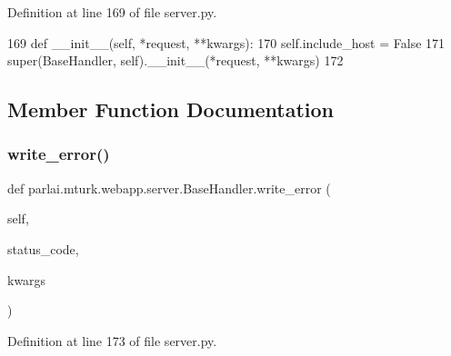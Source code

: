 Definition at line 169 of file server.\+py.


\begin{DoxyCode}
169     \textcolor{keyword}{def }\_\_init\_\_(self, *request, **kwargs):
170         self.include\_host = \textcolor{keyword}{False}
171         super(BaseHandler, self).\_\_init\_\_(*request, **kwargs)
172 
\end{DoxyCode}


\subsection{Member Function Documentation}
\mbox{\label{classparlai_1_1mturk_1_1webapp_1_1server_1_1BaseHandler_a5598d255e3912452fbfcab561819840e}} 
\subsubsection{\texorpdfstring{write\+\_\+error()}{write\_error()}}
{\footnotesize\ttfamily def parlai.\+mturk.\+webapp.\+server.\+Base\+Handler.\+write\+\_\+error (\begin{DoxyParamCaption}\item[{}]{self,  }\item[{}]{status\+\_\+code,  }\item[{}]{kwargs }\end{DoxyParamCaption})}



Definition at line 173 of file server.\+py.


